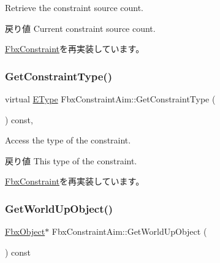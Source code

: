 Retrieve the constraint source count. \begin{DoxyReturn}{戻り値}
Current constraint source count. 
\end{DoxyReturn}


\hyperlink{class_fbx_constraint_aa702f86c6a1832ce3b4905911e66c58f}{Fbx\+Constraint}を再実装しています。

\mbox{\label{class_fbx_constraint_aim_a061ee3079d1182fa2e1a5eeebff01b15}} 
\subsubsection{\texorpdfstring{Get\+Constraint\+Type()}{GetConstraintType()}}
{\footnotesize\ttfamily virtual \hyperlink{class_fbx_constraint_a49c1634663395eab7c28856df233ec66}{E\+Type} Fbx\+Constraint\+Aim\+::\+Get\+Constraint\+Type (\begin{DoxyParamCaption}{ }\end{DoxyParamCaption}) const\hspace{0.3cm}{\ttfamily [protected]}, {\ttfamily [virtual]}}

Access the type of the constraint. \begin{DoxyReturn}{戻り値}
This type of the constraint. 
\end{DoxyReturn}


\hyperlink{class_fbx_constraint_adbeea66a1a605531a019aa6df90dc45b}{Fbx\+Constraint}を再実装しています。

\mbox{\label{class_fbx_constraint_aim_a3d795ffc5b595f49868c6e03a8a9245f}} 
\subsubsection{\texorpdfstring{Get\+World\+Up\+Object()}{GetWorldUpObject()}}
{\footnotesize\ttfamily \hyperlink{class_fbx_object}{Fbx\+Object}$\ast$ Fbx\+Constraint\+Aim\+::\+Get\+World\+Up\+Object (\begin{DoxyParamCaption}{ }\end{DoxyParamCaption}) const}

